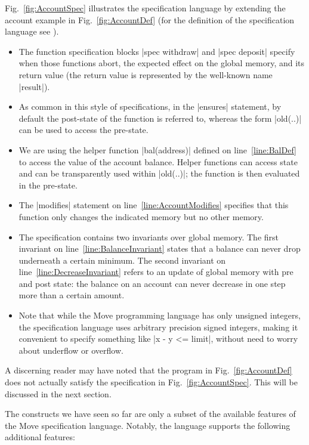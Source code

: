 Fig.~\ref{fig:AccountSpec} illustrates the specification language by extending
the account example in Fig.~\ref{fig:AccountDef} (for the definition of the
specification language see \cite{MOVE_SPEC_LANG_DEF}).
\begin{itemize}
\item The function specification blocks |spec withdraw| and |spec deposit|
  specify when those functions abort, the expected effect on the global memory,
  and its return value (the return value is represented by the well-known name
  |result|).
\item As common in this style of specifications, in the |ensures| statement, by
  default the post-state of the function is referred to, whereas the form
  |old(..)| can be used to access the pre-state.
\item We are using the helper function |bal(address)| defined on
  line~\ref{line:BalDef} to access the value of the account balance. Helper
  functions can access state and can be transparently used within |old(..)|; the
  function is then evaluated in the pre-state.
\item The |modifies| statement on line~\ref{line:AccountModifies} specifies that
  this function only changes the indicated memory but no other memory.
\item The specification contains two invariants over global memory. The first
  invariant on line~\ref{line:BalanceInvariant} states that a balance can never
  drop underneath a certain minimum. The second invariant on
  line~\ref{line:DecreaseInvariant} refers to an update of global memory with
  pre and post state: the balance on an account can never decrease in one step
  more than a certain amount.
\item Note that while the Move programming language has only unsigned integers,
  the specification language uses arbitrary precision signed integers, making it
  convenient to specify something like |x - y <= limit|, without need to worry
  about underflow or overflow.
\end{itemize}

A discerning reader may have noted that the program in Fig.~\ref{fig:AccountDef}
does not actually satisfy the specification in Fig.~\ref{fig:AccountSpec}. This
will be discussed in the next section.

The constructs we have seen so far are only a subset of the available features
of the Move specification language. Notably, the language supports the following
additional features:

